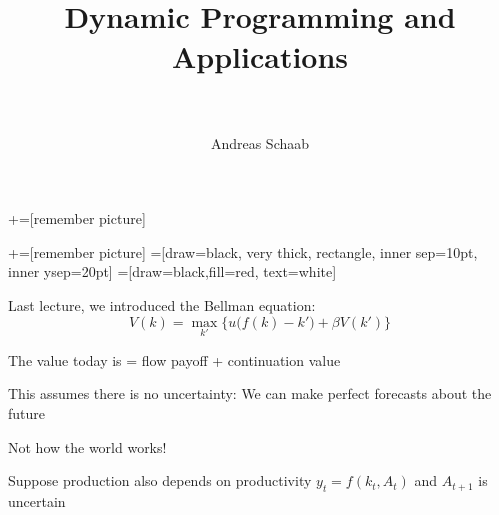 \documentclass[11pt, aspectratio=169]{beamer}
\title[]{\\[8pt]
	{\large \color{blue} Dynamic Programming and Applications \\[5pt] \normalfont{Discrete Time Dynamics and Optimization} \\[10pt] \normalfont{Lecture 2}}}
\author[Schaab]{Andreas Schaab}
\institute{}
\date{}
\newenvironment{witemize}{\itemize\addtolength{\itemsep}{10pt}}{\enditemize}
\begin{document}
+=[remember picture]

\newcommand\marktopleft[1]{%
	\tikz[overlay,remember picture] 
	\node (marker-#1-a) at (-.3em,.3em) {};%
}
\newcommand\markbottomright[2]{%
	\tikz[overlay,remember picture] 
	\node (marker-#1-b) at (0em,0em) {};%
}
+=[remember picture] 
 =[draw=black, very thick, rectangle, inner sep=10pt, inner ysep=20pt]
 =[draw=black,fill=red, text=white]


\addtocounter{framenumber}{-1}
\thispagestyle{empty}
\maketitle 
\newpage


\begin{frame}{}

Last lecture, we introduced the Bellman equation:
\begin{equation*}
	V(k) = \max_{k'} \Big\{ u\Big( f(k) - k' \Big) + \beta V(k') \Big\}
\end{equation*}

\vspace{5mm}
\begin{witemize}
\item The value today is = flow payoff + continuation value

\item This assumes there is no uncertainty: We can make perfect forecasts about the future

	{\footnotesize Not how the world works!} 

\item Suppose production also depends on productivity $y_t = f(k_t, A_t)$ and $A_{t+1}$ is uncertain
\end{witemize}

\end{frame}
\end{document}
